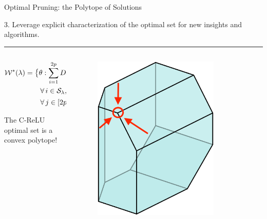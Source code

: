 \documentclass[usenames,dvipsnames,mathserif,notheorems]{beamer}
\newcommand{\horizontalrule}{
	{
			\vspace{-0.5em}
			\center \rule{\textwidth}{0.1em}
			\vspace{-0.2em}
		}
}
\newcommand{\good}[1]{\textcolor{good}{#1}}
\begin{document}
\begin{frame}{Optimal Pruning: the Polytope of Solutions}

	{\raggedright
		\large
		3. Leverage explicit characterization of the optimal
		set for \good{new insights and algorithms}.
		\pause
	}

	\horizontalrule

	\begin{columns}
		\begin{column}{0.5\textwidth}

			\begin{equation*}
				\begin{aligned}
					 & \mathcal{W}^*(\lambda) =
					\big\{ \theta  : \sum_{i=1}^{2p} D_i X \theta_i = \hat y,      \\
					 & \hspace{5em} \forall \, {i}  \in  \mathcal{S}_\lambda,
					\theta_i =  \alpha_{i} q_i, \alpha_{i} \geq 0, \,              \\
					 & \hspace{5em} \forall \, j \in [2p] \setminus \mathcal{S}_\lambda,
					\theta_{j} = 0
					\big\}
				\end{aligned}
			\end{equation*}

			\pause
			The C-ReLU optimal set is a \good{convex polytope}!

		\end{column}
		\begin{column}{0.5\textwidth}
			\pause
			\begin{figure}[c]
				\centering
				\includegraphics[width=0.8\textwidth]{assets/polytope.png}
				\caption{}
				\label{fig:}
			\end{figure}
		\end{column}
	\end{columns}

\end{frame}
\end{document}
